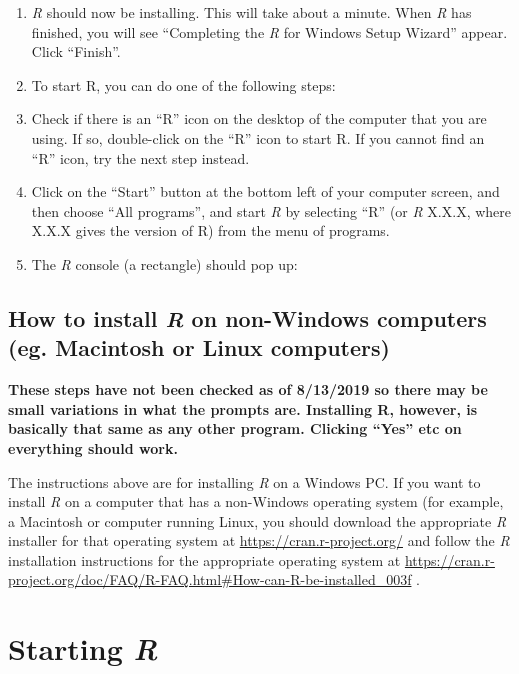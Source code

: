 \documentclass[
]{book}
\begin{document}
\begin{enumerate}
\item
  \emph{R} should now be installing. This will take about a minute. When \emph{R} has finished, you will see ``Completing the \emph{R} for Windows Setup Wizard'' appear. Click ``Finish''.
\item
  To start R, you can do one of the following steps:
\item
  Check if there is an ``R'' icon on the desktop of the computer that you are using. If so, double-click on the ``R'' icon to start R. If you cannot find an ``R'' icon, try the next step instead.
\item
  Click on the ``Start'' button at the bottom left of your computer screen, and then choose ``All programs'', and start \emph{R} by selecting ``R'' (or \emph{R} X.X.X, where X.X.X gives the version of R) from the menu of programs.
\item
  The \emph{R} console (a rectangle) should pop up:
\end{enumerate}

\hypertarget{how-to-install-r-on-non-windows-computers-eg.-macintosh-or-linux-computers}{%
\subsection{\texorpdfstring{How to install \emph{R} on non-Windows computers (eg. Macintosh or Linux computers)}{How to install R on non-Windows computers (eg. Macintosh or Linux computers)}}\label{how-to-install-r-on-non-windows-computers-eg.-macintosh-or-linux-computers}}

\textbf{These steps have not been checked as of 8/13/2019 so there may be small variations in what the prompts are. Installing R, however, is basically that same as any other program. Clicking ``Yes'' etc on everything should work.}

The instructions above are for installing \emph{R} on a Windows PC. If you want to install \emph{R} on a computer that has a non-Windows operating system (for example, a Macintosh or computer running Linux, you should download the appropriate \emph{R} installer for that operating system at \url{https://cran.r-project.org/} and follow the \emph{R} installation instructions for the appropriate operating system at \url{https://cran.r-project.org/doc/FAQ/R-FAQ.html\#How-can-R-be-installed_003f} .

\hypertarget{starting-r}{%
\section{\texorpdfstring{Starting \emph{R}}{Starting R}}\label{starting-r}}
\end{document}
